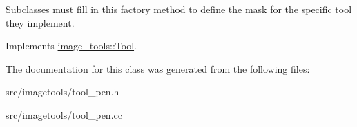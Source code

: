 Subclasses must fill in this factory method to define the mask for the specific tool they implement. 

Implements \hyperlink{classimage__tools_1_1Tool_a7d58325846dbc0467e52221daa1310a7}{image\+\_\+tools\+::\+Tool}.



The documentation for this class was generated from the following files\+:\begin{DoxyCompactItemize}
\item 
src/imagetools/tool\+\_\+pen.\+h\item 
src/imagetools/tool\+\_\+pen.\+cc\end{DoxyCompactItemize}
